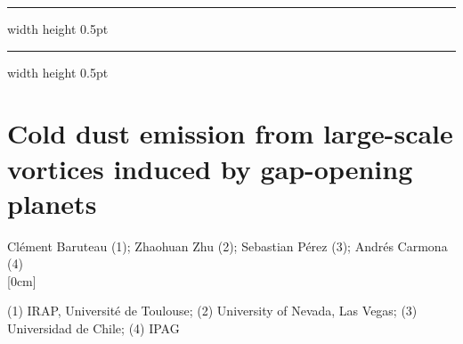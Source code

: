 \documentclass[a4paper,11pt]{book}
\def\doubleline{
\hrule width \hsize height 0.5pt  \kern 1mm \hrule width \hsize height 0.5pt 
}
\begin{document}
\noindent\doubleline
        
          \section[Cold dust emission from large-scale vortices induced by gap-opening planets \newline(Clément Baruteau)] { Cold dust emission from large-scale vortices induced by gap-opening planets }



\begin{center}
{\large Clément Baruteau (1)};{ \large  Zhaohuan Zhu (2)};{ \large  Sebastian Pérez (3)};{ \large  Andrés Carmona (4)}\\



[0cm]



   
  
\vspace{2 mm}
\noindent (1) IRAP, Université de Toulouse; (2)  University of Nevada, Las Vegas; (3)  Universidad de Chile; (4)  IPAG\\

\end{center}



  
\end{document}
